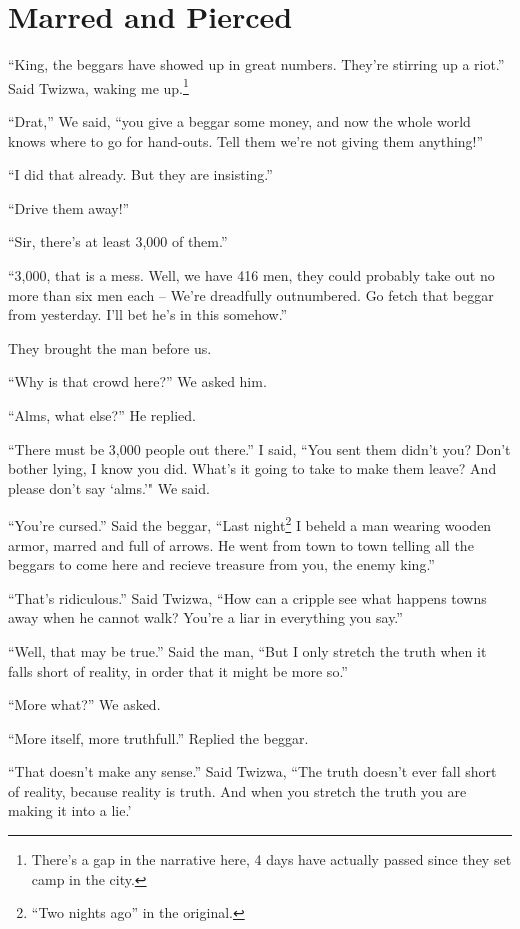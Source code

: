 \chapter {Marred and Pierced}

``King, the beggars have showed up in great numbers. They're stirring up a riot.'' Said Twizwa, waking me up.\footnote{There's a gap in the narrative here, 4 days have actually passed since they set camp in the city.}

``Drat,'' We said, ``you give a beggar some money, and now the whole world knows where to go for hand-outs. Tell them we're not giving them anything!''

``I did that already. But they are insisting.''

``Drive them away!''

``Sir, there's at least 3,000 of them.''

 ``3,000, that is a mess. Well, we have 416 men, they could probably take out no more than six men each -- We're dreadfully outnumbered. Go fetch that beggar from yesterday. I'll bet he's in this somehow.''

They brought the man before us.

``Why is that crowd here?'' We asked him.

``Alms, what else?'' He replied.

``There must be 3,000 people out there.'' I said, ``You sent them didn't you? Don't bother lying, I know you did. What's it going to take to make them leave? And please don't say `alms.'" We said.

``You're cursed.'' Said the beggar, ``Last night\footnote{``Two nights ago'' in the original.} I beheld a man wearing wooden armor, marred and full of arrows. He went from town to town telling all the beggars to come here and recieve treasure from you, the enemy king.''

``That's ridiculous.'' Said Twizwa, ``How can a cripple see what happens towns away when he cannot walk? You're a liar in everything you say.''

``Well, that may be true.'' Said the man, ``But I only stretch the truth when it falls short of reality, in order that it might be more so.''

``More what?'' We asked.

``More itself, more truthfull.'' Replied the beggar.

``That doesn't make any sense.'' Said Twizwa, ``The truth doesn't ever fall short of reality, because reality is truth. And when you stretch the truth you are making it into a lie.'

